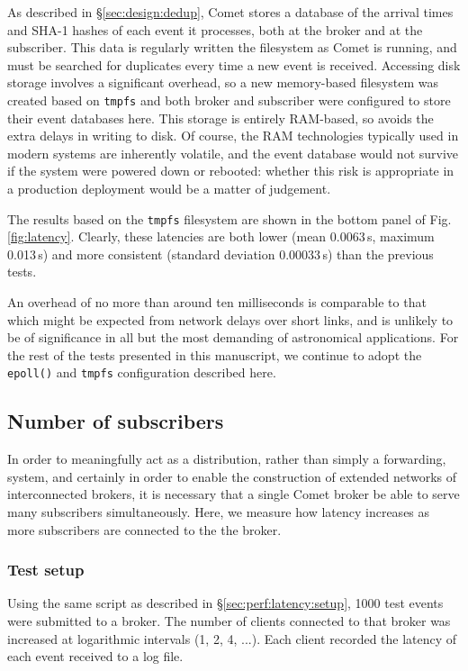 \documentclass[5p,authoryear]{elsarticle}
\begin{document}
As described in \S\ref{sec:design:dedup}, Comet stores a database of the
arrival times and SHA-1 hashes of each event it processes, both at the broker
and at the subscriber. This data is regularly written the filesystem as Comet
is running, and must be searched for duplicates every time a new event is
received. Accessing disk storage involves a significant overhead, so a new
memory-based filesystem was created based on \texttt{tmpfs}
\citep{Kerrisk:2014} and both broker and subscriber were configured to store
their event databases here. This storage is entirely RAM-based, so avoids the
extra delays in writing to disk. Of course, the RAM technologies typically
used in modern systems are inherently volatile, and the event database would
not survive if the system were powered down or rebooted: whether this risk is
appropriate in a production deployment would be a matter of judgement.

The results based on the \texttt{tmpfs} filesystem are shown in the bottom
panel of Fig. \ref{fig:latency}. Clearly, these latencies are both lower (mean
0.0063\,s, maximum 0.013\,s) and more consistent (standard deviation
0.00033\,s) than the previous tests.

An overhead of no more than around ten milliseconds is comparable to that
which might be expected from network delays over short links, and is unlikely
to be of significance in all but the most demanding of astronomical
applications. For the rest of the tests presented in this manuscript, we
continue to adopt the \texttt{epoll()} and \texttt{tmpfs} configuration
described here.

\subsection{Number of subscribers}

In order to meaningfully act as a distribution, rather than simply a
forwarding, system, and certainly in order to enable the construction of
extended networks of interconnected brokers, it is necessary that a single
Comet broker be able to serve many subscribers simultaneously. Here, we
measure how latency increases as more subscribers are connected to the the
broker.

\subsubsection{Test setup}

Using the same script as described in \S\ref{sec:perf:latency:setup}, 1000
test events were submitted to a broker. The number of clients connected to
that broker was increased at logarithmic intervals (1, 2, 4, ...). Each client
recorded the latency of each event received to a log file.
\end{document}
